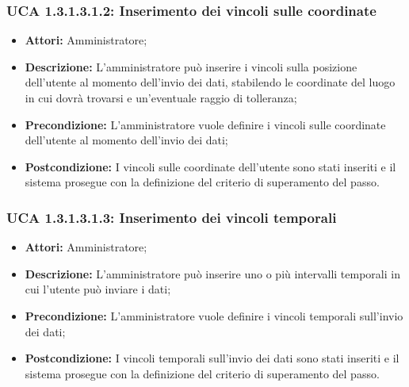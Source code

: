 \hypertarget{A1.3.1.3.1.2}{}
\subsubsection{UCA 1.3.1.3.1.2: Inserimento dei vincoli sulle coordinate}
\begin{itemize}
\item \textbf{Attori:}
 Amministratore;
\item \textbf{Descrizione:} 
L'amministratore può inserire i vincoli sulla posizione dell'utente al momento dell'invio dei dati, stabilendo le coordinate del luogo in cui dovrà trovarsi e un'eventuale raggio di tolleranza;
\item \textbf{Precondizione:} 
L'amministratore vuole definire i vincoli sulle coordinate dell'utente al momento dell'invio dei dati;
\item \textbf{Postcondizione:} 
I vincoli sulle coordinate dell'utente sono stati inseriti e il sistema prosegue con la definizione del criterio di superamento del passo.
\end{itemize}

\hypertarget{A1.3.1.3.1.3}{}
\subsubsection{UCA 1.3.1.3.1.3: Inserimento dei vincoli temporali}
\begin{itemize}
\item \textbf{Attori:}
 Amministratore;
\item \textbf{Descrizione:} 
L'amministratore può inserire uno o più intervalli temporali in cui l'utente può inviare i dati;
\item \textbf{Precondizione:} 
L'amministratore vuole definire i vincoli temporali sull'invio dei dati;
\item \textbf{Postcondizione:} 
I vincoli temporali sull'invio dei dati sono stati inseriti e il sistema prosegue con la definizione del criterio di superamento del passo.
\end{itemize}

\hypertarget{A1.3.1.3.1.4}{}
